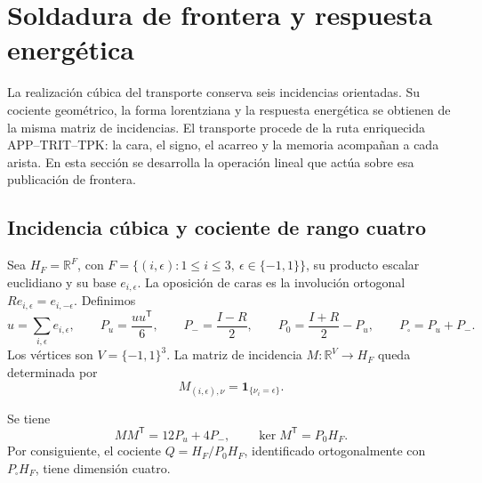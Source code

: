 
\section{Soldadura de frontera y respuesta energética}
\label{vii:vii:sec:pantalla-respuesta}

La realización cúbica del transporte conserva seis incidencias orientadas.
Su cociente geométrico, la forma lorentziana y la respuesta energética
se obtienen de la misma matriz de incidencias. El transporte procede de
la ruta enriquecida APP--TRIT--TPK: la cara, el signo, el acarreo y la
memoria acompañan a cada arista. En esta sección se desarrolla la
operación lineal que actúa sobre esa publicación de frontera.

\subsection{Incidencia cúbica y cociente de rango cuatro}
\label{vii:vii:sec:cociente-pantalla}

Sea \(H_F=\mathbb R^F\), con
\(F=\{(i,\epsilon):1\leq i\leq3,\ \epsilon\in\{-1,1\}\}\),
su producto escalar euclidiano y su base \(e_{i,\epsilon}\).
La oposición de caras es la involución ortogonal
\(Re_{i,\epsilon}=e_{i,-\epsilon}\). Definimos
\[
 u=\sum_{i,\epsilon}e_{i,\epsilon},\qquad
 P_u=\frac{uu^{\mathsf T}}6,\qquad P_-=\frac{I-R}{2},\qquad
 P_0=\frac{I+R}{2}-P_u,\qquad P_\square=P_u+P_-.
\]
Los vértices son \(V=\{-1,1\}^3\). La matriz de incidencia
\(M:\mathbb R^V\longrightarrow H_F\) queda determinada por
\[
 M_{(i,\epsilon),\nu}=\mathbf1_{\{\nu_i=\epsilon\}}.
\]

\begin{proposition}
\label{vii:vii:prop:incidencia}
Se tiene
\[
 MM^{\mathsf T}=12P_u+4P_-,
 \qquad
 \ker M^{\mathsf T}=P_0H_F.
\]
Por consiguiente, el cociente
\(Q=H_F/P_0H_F\), identificado ortogonalmente con
\(P_\square H_F\), tiene dimensión cuatro.
\end{proposition}

